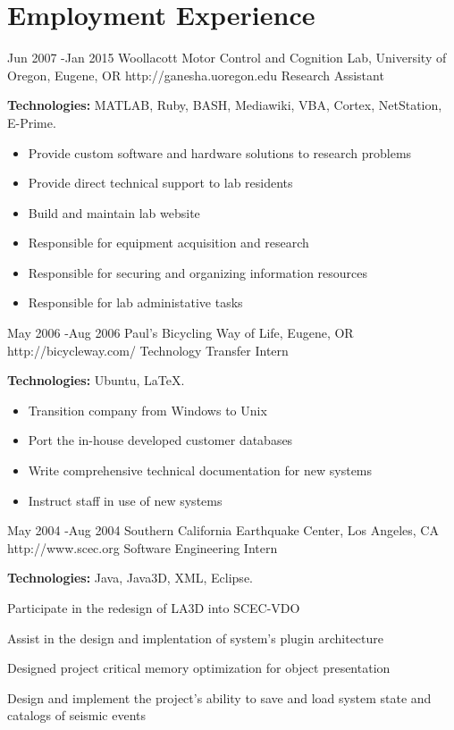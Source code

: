 \documentclass[10pt]{article} %
\begin{document}
\section{Employment Experience}

\job
{Jun 2007 -}{Jan 2015}
{Woollacott Motor Control and Cognition Lab, University of Oregon, Eugene, OR}
{http://ganesha.uoregon.edu}
{Research Assistant}
{\rule{0mm}{5mm}\textbf{Technologies:} MATLAB, Ruby, BASH, Mediawiki, VBA, Cortex, NetStation, E-Prime.

\begin{itemize}
\setlength\itemsep{0.12em}
\item{Provide custom software and hardware solutions to research problems}
\item{Provide direct technical support to lab residents}
\item{Build and maintain lab website}
\item{Responsible for equipment acquisition and research}
\item{Responsible for securing and organizing information resources}
\item{Responsible for lab administative tasks}
\end{itemize}

}


\job
{May 2006 -}{Aug 2006}
{Paul's Bicycling Way of Life, Eugene, OR}
{http://bicycleway.com/}
{Technology Transfer Intern}
{\rule{0mm}{5mm}\textbf{Technologies:} Ubuntu, LaTeX.

\begin{itemize}
\setlength\itemsep{0.12em}
\item{Transition company from Windows to Unix}
\item{Port the in-house developed customer databases}
\item{Write comprehensive technical documentation for new systems}
\item{Instruct staff in use of new systems}
\end{itemize}

}

\job
{May 2004 -}{Aug 2004}
{Southern California Earthquake Center, Los Angeles, CA}
{http://www.scec.org}
{Software Engineering Intern}
{\rule{0mm}{5mm}\textbf{Technologies:} Java, Java3D, XML, Eclipse.

\begin{itemize-noindent}
\setlength\itemsep{0.12em}
\item{Participate in the redesign of LA3D into SCEC-VDO}
\item{Assist in the design and implentation of system's plugin architecture}
\item{Designed project critical memory optimization for object presentation}
\item{Design and implement the project's ability to save and load system state and catalogs of seismic events}
\end{itemize-noindent}

}
\end{document}
